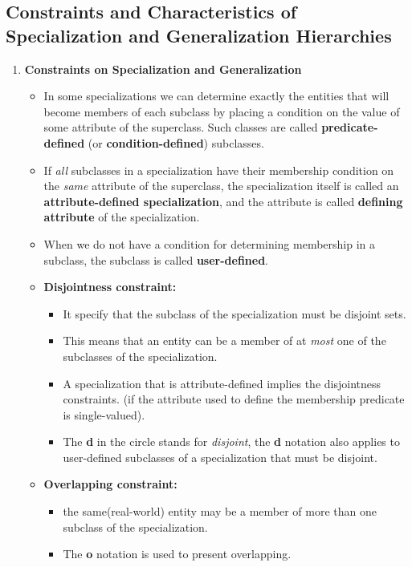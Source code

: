 \documentclass[10pt]{article}
\begin{document}
\subsection{Constraints and Characteristics of Specialization and Generalization Hierarchies}

\begin{enumerate}
	\item \textbf{Constraints on Specialization and Generalization}
	\begin{itemize}
		\item In some specializations we can determine exactly the entities that will become members of each subclass by placing a condition on the value of some attribute of the superclass. Such classes are called \textbf{predicate-defined} (or \textbf{condition-defined}) subclasses.
		\item If \textit{all} subclasses in a specialization have their membership condition on the \textit{same} attribute of the superclass, the specialization itself is called an \textbf{attribute-defined specialization}, and the attribute is called \textbf{defining attribute} of the specialization.
		\item When we do not have a condition for determining membership in a subclass, the subclass is called \textbf{user-defined}.
		\item \textbf{Disjointness constraint: } 
		\begin{itemize}
			\item It specify that the subclass of the specialization must be disjoint sets.
			\item This means that an entity can be a member of at \textit{most} one of the subclasses of the specialization.
			\item A specialization that is attribute-defined implies the disjointness constraints. (if the attribute used to define the membership predicate is single-valued).
			\item The \textbf{d} in the circle stands for \textit{disjoint}, the \textbf{d} notation also applies to user-defined subclasses of a specialization that must be disjoint. 
		\end{itemize}
		\item \textbf{Overlapping constraint: } 
		\begin{itemize}
			\item the same(real-world) entity may be a member of more than one subclass of the specialization.
			\item The \textbf{o} notation is used to present overlapping.
		\end{itemize}


\end{itemize}
\end{enumerate}
\end{document}
